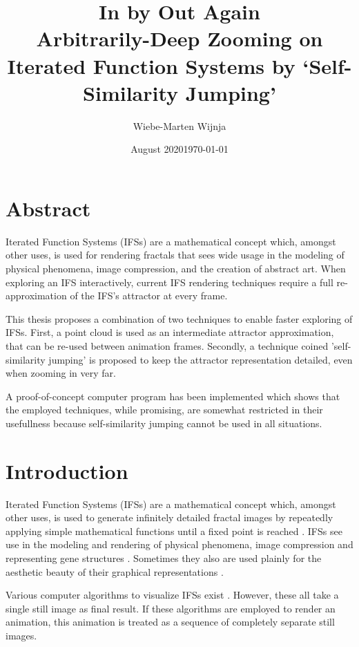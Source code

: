 \documentclass[11pt]{article}
\date{August 2020}
\author{Wiebe-Marten Wijnja}
\date{\today}
\title{\Huge In by Out Again\\\medskip
\large Arbitrarily-Deep Zooming on Iterated Function Systems by `Self-Similarity Jumping'}
\begin{document}
\maketitle
\setcounter{tocdepth}{4}
\tableofcontents

\pagebreak

\section*{Abstract}
\label{sec:orgcbac8f9}
Iterated Function Systems (IFSs) are a mathematical concept which, amongst other uses, 
is used for rendering fractals that sees wide usage in the modeling of physical phenomena, 
image compression, and the creation of abstract art.
When exploring an IFS interactively, current IFS rendering techniques require a full re-approximation of the IFS's attractor at every frame.

This thesis proposes a combination of two techniques to enable faster exploring of IFSs.
First, a point cloud is used as an intermediate attractor approximation, that can be re-used between animation frames.
Secondly, a technique coined 'self-similarity jumping' is proposed to keep the attractor representation detailed, even when zooming in very far.

A proof-of-concept computer program has been implemented
which shows that the employed techniques, while promising, 
are somewhat restricted in their usefullness because self-similarity jumping cannot be used in all situations.

\pagebreak

\section{Introduction}
\label{sec:org81a5d96}

Iterated Function Systems (IFSs) are a mathematical concept which, amongst other uses, is used to generate infinitely detailed fractal images 
by repeatedly applying simple mathematical functions until a fixed point is reached \cite{barnsley1988fractals}. 
IFSs see use in the modeling and rendering of physical phenomena, image compression \cite{hart1996fractal} and representing gene structures \cite{jeffrey1990chaos}.
Sometimes they also are used plainly for the aesthetic beauty of their graphical representations \cite{draves2003fractal}.

Various computer algorithms to visualize IFSs exist \cite{hepting1991rendering}.
However, these all take a single still image as final result. If these algorithms are employed to render an animation,
this animation is treated as a sequence of completely separate still images.
\end{document}
